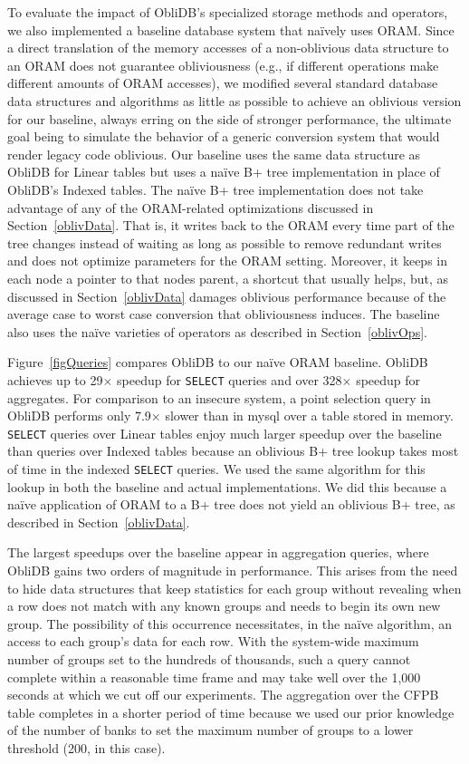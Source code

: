 \documentclass[letterpaper,twocolumn,10pt]{article}
\def\name/{ObliDB}
\begin{document}
To evaluate the impact of \name/'s specialized storage methods and operators, we also implemented a baseline database system that na\"ively uses ORAM. Since a direct translation of the memory accesses of a non-oblivious data structure to an ORAM does not guarantee obliviousness (e.g., if different operations make different amounts of ORAM accesses), we modified several standard database data structures and algorithms as little as possible to achieve an oblivious version for our baseline, always erring on the side of stronger performance, the ultimate goal being to simulate the behavior of a generic conversion system that would render legacy code oblivious. Our baseline uses the same data structure as \name/ for Linear tables but uses a na\"ive B+ tree implementation in place of \name/'s Indexed tables. The na\"ive B+ tree implementation does not take advantage of any of the ORAM-related optimizations discussed in Section~\ref{oblivData}. That is, it writes back to the ORAM every time part of the tree changes instead of waiting as long as possible to remove redundant writes and does not optimize parameters for the ORAM setting. Moreover, it keeps in each node a pointer to that nodes parent, a shortcut that usually helps, but, as discussed in Section~\ref{oblivData} damages oblivious performance because of the average case to worst case conversion that obliviousness induces. The baseline also uses the na\"ive varieties of operators as described in Section~\ref{oblivOps}.

Figure~\ref{figQueries} compares \name/ to our na\"ive ORAM baseline. \name/ achieves up to 29$\times$ speedup for \texttt{SELECT} queries and over 328$\times$ speedup for aggregates. For comparison to an insecure system, a point selection query in \name/ performs only 7.9$\times$ slower than in mysql over a table stored in memory. \texttt{SELECT} queries over Linear tables enjoy much larger speedup over the baseline than queries over Indexed tables because an oblivious B+ tree lookup takes most of time in the indexed \texttt{SELECT} queries. We used the same algorithm for this lookup in both the baseline and actual implementations. We did this because a na\"ive application of ORAM to a B+ tree does not yield an oblivious B+ tree, as described in Section~\ref{oblivData}.

The largest speedups over the baseline appear in aggregation queries, where \name/ gains two orders of magnitude in performance. This arises from the need to hide data structures that keep statistics for each group without revealing when a row does not match with any known groups and needs to begin its own new group. The possibility of this occurrence necessitates, in the na\"ive algorithm, an access to each group's data for each row. With the system-wide maximum number of groups set to the hundreds of thousands, such a query cannot complete within a reasonable time frame and may take well over the 1,000 seconds at which we cut off our experiments. The aggregation over the CFPB table completes in a shorter period of time because we used our prior knowledge of the number of banks to set the maximum number of groups to a lower threshold (200, in this case).
\end{document}

